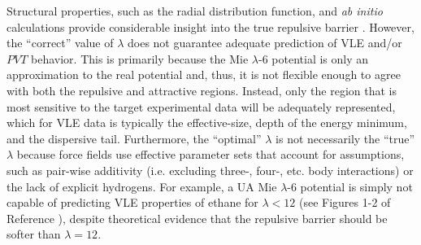 \documentclass[journal=jctc,manuscript=article]{achemso}
\begin{document}
Structural properties, such as the radial distribution function, and \textit{ab initio} calculations provide considerable insight into the true repulsive barrier \cite{Kulakova2017,Galliero2005}. However, the ``correct'' value of $\lambda$ does not guarantee adequate prediction of VLE and/or $PVT$ behavior. This is primarily because the Mie $\lambda$-6 potential is only an approximation to the real potential and, thus, it is not flexible enough to agree with both the repulsive and attractive regions. Instead, only the region that is most sensitive to the target experimental data will be adequately represented, which for VLE data is typically the effective-size, depth of the energy minimum, and the dispersive tail. Furthermore, the ``optimal'' $\lambda$ is not necessarily the ``true'' $\lambda$ because force fields use effective parameter sets that account for assumptions, such as pair-wise additivity (i.e. excluding three-, four-, etc. body interactions) or the lack of explicit hydrogens. For example, a UA Mie $\lambda$-6 potential is simply not capable of predicting VLE properties of ethane for $\lambda < 12$ (see Figures 1-2 of Reference ), despite theoretical evidence that the repulsive barrier should be softer than $\lambda = 12$.





\end{document}
